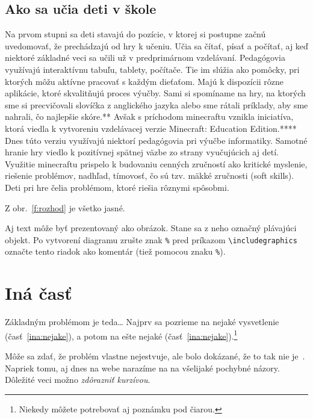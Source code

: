 \documentclass[10pt,twoside,slovak,a4paper]{article}
\begin{document}
\subsection{Ako sa učia deti v škole} \label{nejaka:nieco}
Na prvom stupni sa deti stavajú do pozície, v ktorej si postupne začnú uvedomovať, že prechádzajú od hry k učeniu. Učia sa čítať, písať a počítať, aj keď niektoré základné veci sa učili už v predprimárnom vzdelávaní. Pedagógovia využívajú interaktívnu tabuľu, tablety, počítače. Tie im slúžia ako pomôcky, pri ktorých môžu aktívne pracovať s každým dieťaťom. Majú k dispozícii rôzne aplikácie, ktoré skvalitňujú proces výučby. Sami si spomíname na hry, na ktorých sme si precvičovali slovíčka z anglického jazyka alebo sme rátali príklady, aby sme nahrali, čo najlepšie skóre.** Avšak s príchodom minecraftu vznikla iniciatíva, ktorá viedla k vytvoreniu vzdelávacej verzie Minecraft: Education Edition.**** Dnes túto verziu využívajú niektorí pedagógovia pri výučbe informatiky. Samotné hranie hry viedlo k pozitívnej spätnej väzbe zo strany vyučujúcich aj detí. Využitie minecraftu prispelo k budovaniu cenných zručností ako kritické myslenie, riešenie problémov, nadhľad, tímovosť, čo sú tzv. mäkké zručnosti (soft skills). Deti pri hre čelia problémom, ktoré riešia rôznymi spôsobmi. 

Z obr.~\ref{f:rozhod} je všetko jasné. 

\begin{figure*}[tbh]
\centering
Aj text môže byť prezentovaný ako obrázok. Stane sa z neho označný plávajúci objekt. Po vytvorení diagramu zrušte znak \texttt{\%} pred príkazom \verb|\includegraphics| označte tento riadok ako komentár (tiež pomocou znaku \texttt{\%}).
\caption{Rozhodujúci argument.}
\label{f:rozhod}
\end{figure*}



\section{Iná časť} \label{ina}

Základným problémom je teda\ldots{} Najprv sa pozrieme na nejaké vysvetlenie (časť~\ref{ina:nejake}), a potom na ešte nejaké (časť~\ref{ina:nejake}).\footnote{Niekedy môžete potrebovať aj poznámku pod čiarou.}

Môže sa zdať, že problém vlastne nejestvuje\cite{Coplien:MPD}, ale bolo dokázané, že to tak nie je~\cite{Czarnecki:Staged, Czarnecki:Progress}. Napriek tomu, aj dnes na webe narazíme  na na všelijaké pochybné názory\cite{PLP-Framework}. Dôležité veci možno \emph{zdôrazniť kurzívou}.
\end{document}
